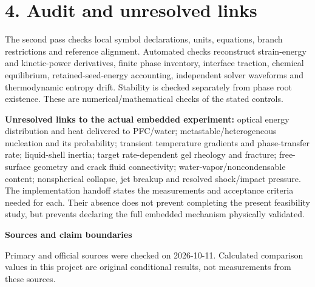 \documentclass[10pt,a4paper]{article}
\begin{document}
\section*{4. Audit and unresolved links}
The second pass checks local symbol declarations, units, equations, branch restrictions and reference alignment. Automated checks reconstruct strain-energy and kinetic-power derivatives, finite phase inventory, interface traction, chemical equilibrium, retained-seed-energy accounting, independent solver waveforms and thermodynamic entropy drift. Stability is checked separately from phase root existence. These are numerical/mathematical checks of the stated controls.

\textbf{Unresolved links to the actual embedded experiment:} optical energy distribution and heat delivered to PFC/water; metastable/heterogeneous nucleation and its probability; transient temperature gradients and phase-transfer rate; liquid-shell inertia; target rate-dependent gel rheology and fracture; free-surface geometry and crack fluid connectivity; water-vapor/noncondensable content; nonspherical collapse, jet breakup and resolved shock/impact pressure. The implementation handoff states the measurements and acceptance criteria needed for each. Their absence does not prevent completing the present feasibility study, but prevents declaring the full embedded mechanism physically validated.

\newpage
\begin{center}\Large\bfseries Sources and claim boundaries\end{center}
Primary and official sources were checked on 2026-10-11. Calculated comparison values in this project are original conditional results, not measurements from these sources.
\end{document}
